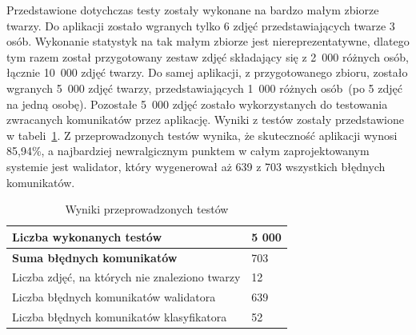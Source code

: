 Przedstawione dotychczas testy zostały wykonane na bardzo małym zbiorze twarzy.
Do aplikacji zostało wgranych tylko 6 zdjęć przedstawiających twarze 3 osób.
Wykonanie statystyk na tak małym zbiorze jest niereprezentatywne,
dlatego tym razem został przygotowany zestaw zdjęć składający się z 2~000 różnych osób, łącznie 10~000 zdjęć twarzy.
Do samej aplikacji, z przygotowanego zbioru, zostało wgranych 5~000 zdjęć twarzy,
przedstawiających 1~000 różnych osób~(po 5 zdjęć na jedną osobę).
Pozostałe 5~000 zdjęć zostało wykorzystanych do testowania zwracanych komunikatów przez aplikację.
Wyniki z testów zostały przedstawione w tabeli~\ref{tab:app_stats}.
Z przeprowadzonych testów wynika, że skuteczność aplikacji wynosi 85,94\%,
a najbardziej newralgicznym punktem w całym zaprojektowanym systemie jest walidator,
który wygenerował aż 639 z 703 wszystkich błędnych komunikatów.


\begin{table}[H]
    \centering
    \caption{Wyniki przeprowadzonych testów}
    \label{tab:app_stats}
    \begin{tabular}{|l|l|}
        \hline
        \textbf{Liczba wykonanych testów}              & 5 000 \\ \hline
        \textbf{Suma błędnych komunikatów}             & 703   \\ \hline
        Liczba zdjęć, na których nie znaleziono twarzy & 12    \\ \hline
        Liczba błędnych komunikatów walidatora         & 639   \\ \hline
        Liczba błędnych komunikatów klasyfikatora      & 52    \\ \hline
    \end{tabular}
\end{table}